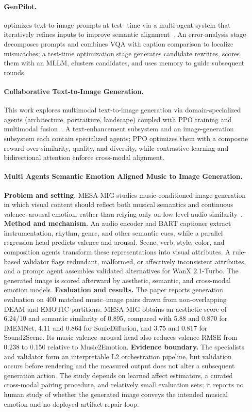 \paragraph{GenPilot.}
 optimizes text-to-image prompts at test- time via a multi-agent system that iteratively refines inputs to improve semantic alignment~\cite{avg251007217}. An error-analysis stage decomposes prompts and combines VQA with caption comparison to localize mismatches; a test-time optimization stage generates candidate rewrites, scores them with an MLLM, clusters candidates, and uses memory to guide subsequent rounds.

\paragraph{Collaborative Text-to-Image Generation.}
This work explores multimodal text-to-image generation via domain-specialized agents (architecture, portraiture, landscape) coupled with PPO training and multimodal fusion~\cite{avg251010633}. A text-enhancement subsystem and an image-generation subsystem each contain specialized agents; PPO optimizes them with a composite reward over similarity, quality, and diversity, while contrastive learning and bidirectional attention enforce cross-modal alignment. 

\paragraph{Multi Agents Semantic Emotion Aligned Music to Image Generation.}
\textbf{Problem and setting.} MESA-MIG studies music-conditioned image generation in which visual content should reflect both musical semantics and continuous valence--arousal emotion, rather than relying only on low-level audio similarity~\cite{avg251223320}. \textbf{Method and mechanism.} An audio encoder and BART captioner extract instrumentation, rhythm, genre, and other semantic cues, while a parallel regression head predicts valence and arousal. Scene, verb, style, color, and composition agents transform these representations into visual attributes. A rule-based validator flags redundant, malformed, or affectively inconsistent attributes, and a prompt agent assembles validated alternatives for WanX 2.1-Turbo. The generated image is scored afterward by aesthetic, semantic, and cross-modal emotion models. \textbf{Evaluation and results.} The paper reports generation evaluation on 400 matched music--image pairs drawn from non-overlapping DEAM and EMOTIC partitions. MESA-MIG obtains an aesthetic score of 6.24/10 and semantic similarity of 0.895, compared with 5.88 and 0.870 for IMEMNet, 4.11 and 0.864 for SonicDiffusion, and 3.75 and 0.817 for Sound2Scene. Its music valence--arousal head also reduces valence RMSE from 0.238 to 0.150 relative to Music2Emotion. \textbf{Evidence boundary.} The specialists and validator form an interpretable L2 orchestration pipeline, but validation occurs before rendering and the measured output does not alter a subsequent generation action. The study depends on learned affect estimators, a curated cross-modal pairing procedure, and relatively small evaluation sets; it reports no human study of whether the generated image conveys the intended musical emotion and no deployed artifact-repair loop.

